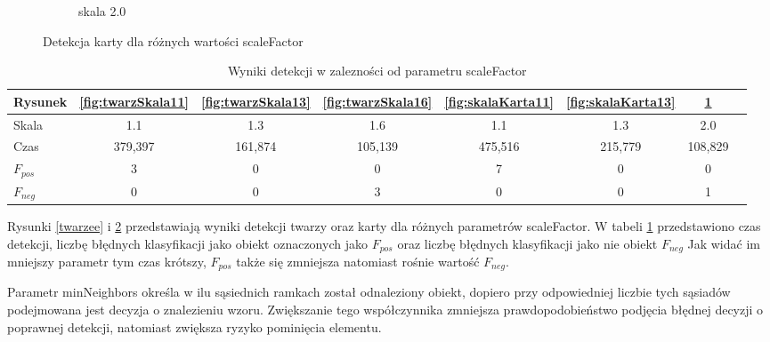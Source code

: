 \begin{figure}[H]
\begin{subfigure}{0.32\textwidth}
        \caption{skala 2.0}
        \label{fig:skalaKarta20}
    \end{subfigure}
    \caption{Detekcja karty dla różnych wartości scaleFactor}
    \label{kartyy}
\end{figure}

\begin{table}[H]
    \caption{Wyniki detekcji w zalezności od parametru scaleFactor}
    \label{tab:skale}
    \begin{tabular}{|l|c|c|c|c|c|c|c|}
\hline
Rysunek & \ref{fig:twarzSkala11} & \ref{fig:twarzSkala13} & \ref{fig:twarzSkala16} & \ref{fig:skalaKarta11} & \ref{fig:skalaKarta13} & \ref{fig:skalaKarta20}\\
\hline
Skala & 1.1 & 1.3 & 1.6 & 1.1 & 1.3 & 2.0\\
\hline
Czas & 379,397 & 161,874 & 105,139 & 475,516 & 215,779 & 108,829\\
\hline
$F_{pos}$ & 3 & 0 & 0 & 7 & 0 & 0\\
\hline
$F_{neg}$ & 0 & 0 & 3 & 0 & 0 & 1\\
\hline
\end{tabular}
\end{table}

Rysunki \ref{twarzee} i \ref{kartyy} przedstawiają wyniki detekcji twarzy oraz karty dla różnych parametrów scaleFactor. W tabeli \ref{tab:skale} przedstawiono czas detekcji, liczbę błędnych klasyfikacji jako obiekt oznaczonych jako ${F_{pos}}$ oraz liczbę błędnych klasyfikacji jako nie obiekt ${F_{neg}}$ Jak widać im mniejszy parametr tym czas krótszy, ${F_{pos}}$ także się zmniejsza natomiast rośnie wartość ${F_{neg}}$.

Parametr minNeighbors określa w ilu sąsiednich ramkach został odnaleziony obiekt, dopiero przy odpowiedniej liczbie tych sąsiadów podejmowana jest decyzja o znalezieniu wzoru. Zwiększanie tego współczynnika zmniejsza prawdopodobieństwo podjęcia błędnej decyzji o poprawnej detekcji, natomiast zwiększa ryzyko pominięcia elementu.


